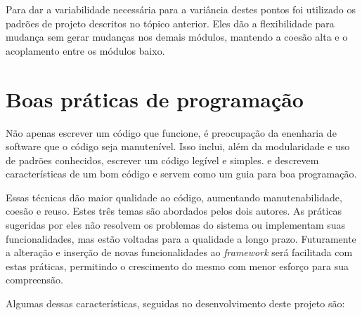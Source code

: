 Para dar a variabilidade necessária para a variância destes pontos foi utilizado os padrões de projeto descritos no tópico anterior. Eles dão a flexibilidade para mudança sem gerar mudanças nos demais módulos, mantendo a coesão alta e o acoplamento entre os módulos baixo.

\section{Boas práticas de programação}

Não apenas escrever um código que funcione, é preocupação da enenharia de software que o código seja manutenível. Isso inclui, além da modularidade e uso de padrões conhecidos, escrever um código legível e simples. \cite{Goodliffe2007} e \cite{McConnel2004} descrevem características de um bom código e servem como um guia para boa programação.

Essas técnicas dão maior qualidade ao código, aumentando manutenabilidade, coesão e reuso. Estes três temas são abordados pelos dois autores. As práticas sugeridas por eles não resolvem os problemas do sistema ou implementam suas funcionalidades, mas estão voltadas para a qualidade a longo prazo. Futuramente a alteração e inserção de novas funcionalidades ao \textit{framework} será facilitada com estas práticas, permitindo o crescimento do mesmo com menor esforço para sua compreensão.

Algumas dessas características, seguidas no desenvolvimento deste projeto são:

